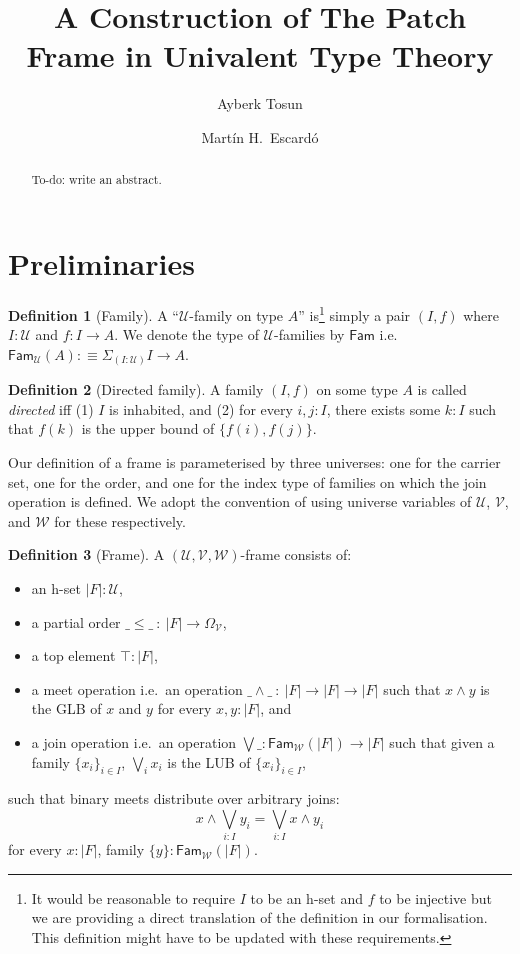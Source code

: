 \documentclass[a4paper, 11pt]{article}
\title{A Construction of The Patch Frame in Univalent Type Theory}
\author{Ayberk Tosun \and Mart\'{i}n H.\ Escard\'{o}}
\theoremstyle{definition}
\newtheorem{defn}{Definition}
\newcommand{\UU}{\mathcal{U}}
\newcommand{\VV}{\mathcal{V}}
\newcommand{\WW}{\mathcal{W}}
\newcommand{\todo}[1]{{\large\color{orange}\textsf{To-do: #1.}}}
\begin{document}
\maketitle

\begin{abstract}
  \todo{write an abstract}
\end{abstract}

\section{Preliminaries}

\begin{defn}[Family]
  A ``$\UU$-family on type $A$'' is\footnote{%
    It would be reasonable to require $I$ to be an h-set and $f$ to be injective but we are
    providing a direct translation of the definition in our formalisation. This definition might
    have to be updated with these requirements.
  }
  simply a pair $(I, f)$ where $I : \UU$ and $f : I \rightarrow A$. We denote the type of
  $\UU$-families by $\mathsf{Fam}$ i.e.\ $\mathsf{Fam}_{\UU}(A) :\equiv \Sigma_{(I : \UU)} I \rightarrow A$.
\end{defn}

\begin{defn}[Directed family]
  A family $(I, f)$ on some type $A$ is called \emph{directed} iff (1) $I$ is inhabited, and (2) for
  every $i, j : I$, there exists some $k : I$ such that $f(k)$ is the upper bound of
  $\{ f(i), f(j) \}$.
\end{defn}

Our definition of a frame is parameterised by three universes: one for the carrier set, one for the
order, and one for the index type of families on which the join operation is defined. We adopt the
convention of using universe variables of $\UU$, $\VV$, and $\WW$ for these respectively.

\begin{defn}[Frame]
  A $(\UU, \VV, \WW)$-frame consists of:
  \begin{itemize}
    \item an h-set $| F | : \UU$,
    \item a partial order $\_\le\_\ :\ | F | \rightarrow \Omega_\VV$,
    \item a top element $\top : | F |$,
    \item a meet operation i.e.\ an operation $\_\wedge\_\ :\ | F | \rightarrow | F | \rightarrow | F |$
      such that $x \wedge y$ is the GLB of $x$ and $y$ for every $x, y : | F |$, and
    \item a join operation i.e.\ an operation $\bigvee\_ : \mathsf{Fam}_{\WW}(| F |) \rightarrow
      | F |$ such that given a family $\{ x_i \}_{i \in I}$, $\bigvee_i x_i$ is the LUB
      of $\{ x_i \}_{i \in I}$,
  \end{itemize}
  such that binary meets distribute over arbitrary joins:
  \begin{equation*}
    x \wedge \bigvee_{i : I} y_i = \bigvee_{i : I} x \wedge y_i
  \end{equation*}
  for every $x : | F |$, family $\{ y \} : \mathsf{Fam}_{\WW}(| F |)$.
\end{defn}
\end{document}
